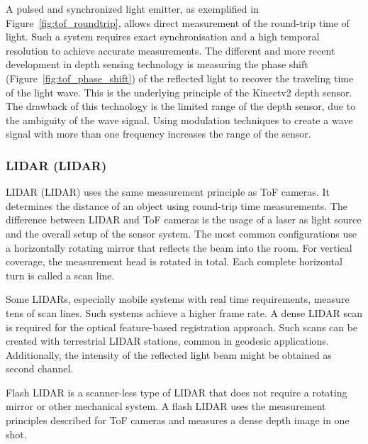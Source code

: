 A pulsed and synchronized light emitter, as exemplified in Figure~\ref{fig:tof_roundtrip}, allows direct measurement of the round-trip time of light.
Such a system requires exact synchronisation and a high temporal resolution to achieve accurate measurements.
The different and more recent development in depth sensing technology is measuring the phase shift (Figure~\ref{fig:tof_phase_shift}) of the reflected light to recover the traveling time of the light wave.
This is the underlying principle of the Kinectv2 depth sensor\cite{wasenmuller_accv2016}.
The drawback of this technology is the limited range of the depth sensor, due to the ambiguity of the wave signal.
Using modulation techniques to create a wave signal with more than one frequency increases the range of the sensor\cite[p. 27-41]{hansard_springer2012}.

\subsubsection{\acrlong{LIDAR} (\acrshort{LIDAR})}

\acrlong{LIDAR} (\acrshort{LIDAR}) uses the same measurement principle as \acrshort{ToF} cameras\cite[p. 239]{taylor_crc2019}.
It determines the distance of an object using round-trip time measurements.
The difference between \acrshort{LIDAR} and \acrshort{ToF} cameras is the usage of a \acrshort{laser} as light source and the overall setup of the sensor system.
The most common configurations use a horizontally rotating mirror that reflects the beam into the room.
For vertical coverage, the measurement head is rotated in total.
Each complete horizontal turn is called a scan line.

Some \acrshort{LIDAR}s, especially mobile systems with real time requirements, measure tens of scan lines.
Such systems achieve a higher frame rate.
A dense \acrshort{LIDAR} scan is required for the optical feature-based registration approach.
Such scans can be created with terrestrial \acrshort{LIDAR} stations, common in geodesic applications.
Additionally, the intensity of the reflected light beam might be obtained as second channel.

Flash \acrshort{LIDAR} is a scanner-less type of \acrshort{LIDAR} that does not require a rotating mirror or other mechanical system\cite{natale_ssiai2010}.
A flash \acrshort{LIDAR} uses the measurement principles described for \acrshort{ToF} cameras and measures a dense depth image in one shot.
